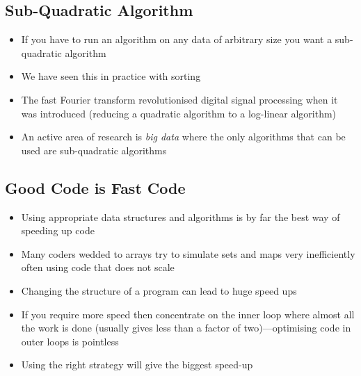 
\begin{slide}
\section{Sub-Quadratic Algorithm}

\begin{PauseHighLight}
  \begin{itemize}
  \item If you have to run an algorithm on any data of arbitrary size
    you want a sub-quadratic algorithm\pause
  \item We have seen this in practice with sorting\pause
  \item The fast Fourier transform revolutionised digital signal
    processing when it was introduced (reducing a quadratic algorithm to
    a log-linear algorithm)\pause
  \item An active area of research is \emph{big data} where the only
    algorithms that can be used are sub-quadratic algorithms\pause
  \end{itemize}
\end{PauseHighLight}

\end{slide}


\begin{slide}
\section[-1]{Good Code is Fast Code}

\begin{PauseHighLight}
  \begin{itemize}
  \item Using appropriate data structures and algorithms is by far the
    best way of speeding up code\pause
  \item Many coders wedded to arrays try to simulate sets and maps very
    inefficiently often using code that does not scale\pause
  \item Changing the structure of a program can lead to huge speed
    ups\pause
  \item If you require more speed then concentrate on the inner loop
    where almost all the work is done (usually gives less than a factor
    of two)---optimising code in outer loops is pointless\pause
  \item Using the right strategy will give the biggest speed-up\pause
  \end{itemize}
\end{PauseHighLight}

\end{slide}




